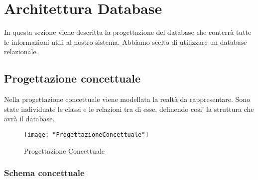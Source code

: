\section{Architettura Database}{
	In questa sezione viene descritta la progettazione del database che conterrà tutte le informazioni utili al nostro sistema. Abbiamo scelto di utilizzare un database relazionale.
	
	\subsection{Progettazione concettuale}{
		Nella progettazione concettuale viene modellata la realtà da rappresentare. Sono state individuate le classi e le relazioni tra di esse, definendo cosi' la struttura che avrà il database.
		
		\begin{figure}[ht]
				\texttt{[image: "ProgettazioneConcettuale"]}
				\caption{Progettazione Concettuale}
				\label{Fig. Progettazione Concettuale}
		\end{figure}
			
			\subsubsection{Schema concettuale}
			
}}
